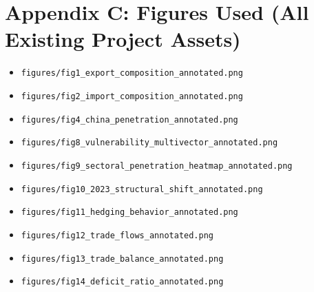 \documentclass[12pt]{article}
\begin{document}
\section{Appendix C: Figures Used (All Existing Project Assets)}
\begin{itemize}[leftmargin=*]
\item \texttt{figures/fig1\_export\_composition\_annotated.png}
\item \texttt{figures/fig2\_import\_composition\_annotated.png}
\item \texttt{figures/fig4\_china\_penetration\_annotated.png}
\item \texttt{figures/fig8\_vulnerability\_multivector\_annotated.png}
\item \texttt{figures/fig9\_sectoral\_penetration\_heatmap\_annotated.png}
\item \texttt{figures/fig10\_2023\_structural\_shift\_annotated.png}
\item \texttt{figures/fig11\_hedging\_behavior\_annotated.png}
\item \texttt{figures/fig12\_trade\_flows\_annotated.png}
\item \texttt{figures/fig13\_trade\_balance\_annotated.png}
\item \texttt{figures/fig14\_deficit\_ratio\_annotated.png}
\end{itemize}
\end{document}
